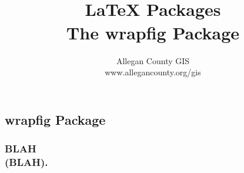 \documentclass[class=report , crop=false, multi={itemize, figure}, float=false]{standalone}
\title{ %
\HRule %
\\[.4cm] %
	\Huge \bfseries \LaTeX{} Packages\\ \medskip\large The wrapfig Package %
\HRule \\[.4cm] %
}  %
\author{\Large Allegan County GIS \\\Large www.allegancounty.org/gis} %
\begin{document}

\ifstandalone
\maketitle %
\tableofcontents %
\clearpage
\fi


\subsection{wrapfig Package}
	\medskip 
	\subsubsection{\Large BLAH \\\small(BLAH).}
	
	
	
	
\end{document}
